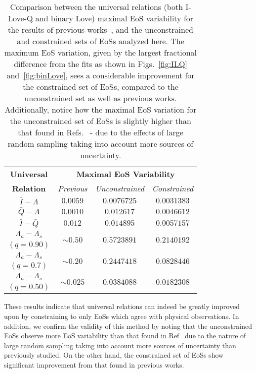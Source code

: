 \documentclass[prd,twocolumn,nofootinbib,superscriptaddress,amsmath,amssymb]{revtex4-1}
\begin{document}
\begin{table}
\centering
\caption{
Comparison between the universal relations (both I-Love-Q and binary Love) maximal EoS variability for the results of previous works~\cite{Yagi:ILQ,Yagi:binLove}, and the unconstrained and constrained sets of EoSs analyzed here. 
The maximum EoS variation, given by the largest fractional difference from the fits as shown in Figs.~\ref{fig:ILQ} and~\ref{fig:binLove}, sees a considerable improvement for the constrained set of EoSs, compared to the unconstrained set as well as previous works.
Additionally, notice how the maximal EoS variation for the unconstrained set of EoSs is slightly higher than that found in Refs.~\cite{Yagi:ILQ,Yagi:binLove} - due to the effects of large random sampling taking into account more sources of uncertainty.
}\label{tab:maxVar}
\begin{tabular}{ c  || c c c } 
 \hline
 \hline
 \textbf{Universal} & \multicolumn{3}{c}{\textbf{Maximal EoS Variability}} \\
 \cline{2-4}
 \textbf{Relation} & \multicolumn{1}{c|}{\emph{Previous}} & \multicolumn{1}{c|}{\emph{Unconstrained}} & \emph{Constrained}\\
 \hline
 $\bar{I}-\Lambda$ &  $0.0059$ & $0.0076725$ & $0.0031383$\\
 $\bar{Q}-\Lambda$ & $0.0010$ & $0.012617$ & $0.0046612$\\
 $\bar{I}-\bar{Q}$ & $0.012$ & $0.014895$ & $0.0057157$\\
 \hline
 $\Lambda_a-\Lambda_s$ & \multirow{2}{*}{$\sim0.50$} & \multirow{2}{*}{$0.5723891$} & \multirow{2}{*}{$0.2140192$}\\
 $(q=0.90)$ & & &\\
 \cline{1-1}
 $\Lambda_a-\Lambda_s$ & \multirow{2}{*}{$\sim0.20$} & \multirow{2}{*}{$0.2447418$} & \multirow{2}{*}{$0.0828446$}\\
  $(q=0.7)$ & & &\\
  \cline{1-1}
 $\Lambda_a-\Lambda_s$ & \multirow{2}{*}{$\sim0.025$} & \multirow{2}{*}{$0.0384088$} & \multirow{2}{*}{$0.0182308$}\\
  $(q=0.50)$ & & &\\
  \cline{1-1}
\hline
\hline
\end{tabular}
\end{table}


These results indicate that universal relations can indeed be greatly improved upon by constraining to only EoSs which agree with physical observations.
In addition, we confirm the validity of this method by noting that the unconstrained EoSs observe more EoS variability than that found in Ref~\cite{Yagi:ILQ} due to the nature of large random sampling taking into account more sources of uncertainty than previously studied.
On the other hand, the constrained set of EoSs show significant improvement from that found in previous works.
\end{document}
